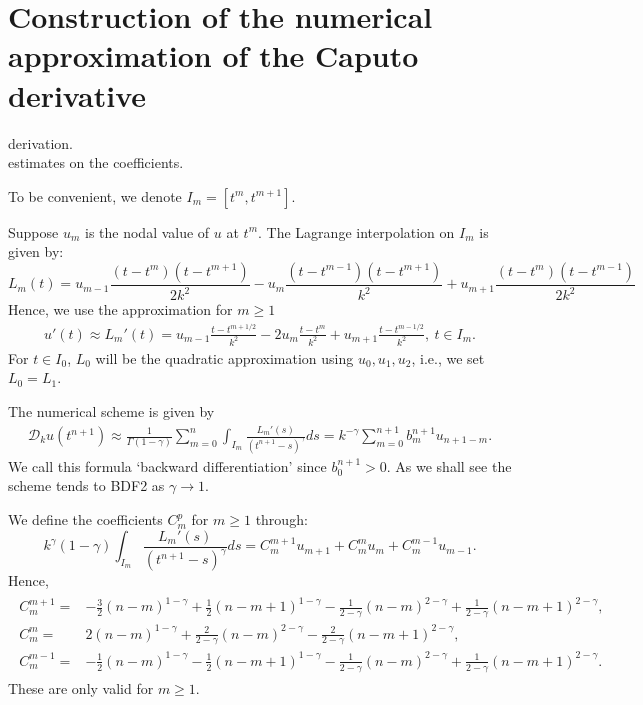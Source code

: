 \documentclass[11pt]{article} %
\begin{document}
\section{Construction of the numerical approximation of the Caputo derivative}
derivation.  \\
estimates on the coefficients.

To be convenient, we denote $I_m=[t^m, t^{m+1}]$.

Suppose $u_m$ is the nodal value of $u$ at $t^m$. The Lagrange interpolation on $I_m$ is given by:
$$
L_m(t)=u_{m-1}\frac{(t-t^m)(t-t^{m+1})}{2k^2}-u_m\frac{(t-t^{m-1})(t-t^{m+1})}{k^2}+u_{m+1}\frac{(t-t^m)(t-t^{m-1})}{2k^2}
$$
Hence, we use the approximation for $m\ge 1$
\begin{gather}
u'(t)\approx L_m'(t)=u_{m-1}\frac{t-t^{m+1/2}}{k^2}-2u_m\frac{t-t^m}{k^2}+u_{m+1}\frac{t-t^{m-1/2}}{k^2},\ t\in I_m.
\end{gather}
For $t\in I_0$, $L_0$ will be the quadratic approximation using $u_0, u_1, u_2$, i.e., we set $L_0=L_1$.

The numerical scheme is given by
\begin{gather}
\mathcal{D}_ku(t^{n+1})\approx\frac{1}{\Gamma(1-\gamma)}\sum_{m=0}^n
\int_{I_m}\frac{L_m'(s)}{(t^{n+1}-s)^{\gamma}}ds=k^{-\gamma}\sum_{m=0}^{n+1}b^{n+1}_m u_{n+1-m}.
\end{gather}
We call this formula `backward differentiation' since $b_0^{n+1}>0$. As we shall see the scheme tends to BDF2 as $\gamma\to 1$.

We define the coefficients $C_m^p$ for $m\ge 1$ through: $$
k^{\gamma}(1-\gamma)\int_{I_m}\frac{L_m'(s)}{(t^{n+1}-s)^{\gamma}}ds=C_m^{m+1}u_{m+1}+C_m^mu_m+C_{m}^{m-1}u_{m-1}.
$$
Hence,
\begin{gather*}
\begin{array}{cl}
C_m^{m+1}=&-\frac{3}{2}(n-m)^{1-\gamma}+\frac{1}{2}(n-m+1)^{1-\gamma}
-\frac{1}{2-\gamma}(n-m)^{2-\gamma}+\frac{1}{2-\gamma}(n-m+1)^{2-\gamma},\\
C_m^m=&2(n-m)^{1-\gamma}+\frac{2}{2-\gamma}(n-m)^{2-\gamma}
-\frac{2}{2-\gamma}(n-m+1)^{2-\gamma},\\
C_m^{m-1}=&-\frac{1}{2}(n-m)^{1-\gamma}-\frac{1}{2}(n-m+1)^{1-\gamma}
-\frac{1}{2-\gamma}(n-m)^{2-\gamma}+\frac{1}{2-\gamma}(n-m+1)^{2-\gamma}.
\end{array}
\end{gather*}
These are only valid for $m\ge 1$.
\end{document}
